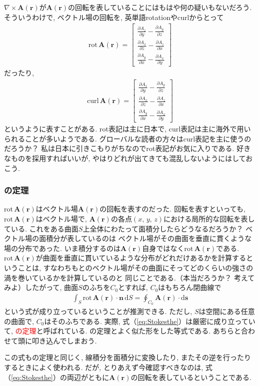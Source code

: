 $\nabla \times \bm{A}(\bm{r})$が$\bm{A}(\bm{r})$の回転を表していることにはもはや何の疑いもないだろう. 
そういうわけで, ベクトル場の回転を, 英単語rotationやcurlからとって
\begin{eqnarray}
\mathrm{rot} \, \bm{A}(\bm{r}) = \left[
\begin{array}{c}
\displaystyle
\frac{\partial A_z}{\partial y} - \frac{\partial A_y}{\partial z} \\
\displaystyle
\frac{\partial A_x}{\partial z} - \frac{\partial A_z}{\partial x} \\
\displaystyle
\frac{\partial A_y}{\partial x} - \frac{\partial A_x}{\partial y} 
\end{array}
\right]
\label{eq:rotrot}
\end{eqnarray}
だったり, 
\begin{eqnarray}
\mathrm{curl} \, \bm{A}(\bm{r}) = \left[
\begin{array}{c}
\displaystyle
\frac{\partial A_z}{\partial y} - \frac{\partial A_y}{\partial z} \\
\displaystyle
\frac{\partial A_x}{\partial z} - \frac{\partial A_z}{\partial x} \\
\displaystyle
\frac{\partial A_y}{\partial x} - \frac{\partial A_x}{\partial y} 
\end{array}
\right]
\label{eq:rotcurl}
\end{eqnarray}
というように表すことがある. rot表記は主に日本で, curl表記は主に海外で用いられることが多いようである. 
グローバルな読者の方々はcurl表記を主に使うのだろうか？ 私は日本に引きこもりがちなのでrot表記がお気に入りである. 
好きなものを採用すればいいが, やはりどれが出てきても混乱しないようにはしておこう. 

\subsubsection{の定理}
$\mathrm{rot} \, \bm{A}(\bm{r})$はベクトル場$\bm{A}(\bm{r})$の回転を表すのだった. 
回転を表すといっても, $\mathrm{rot} \, \bm{A}(\bm{r})$はベクトル場で, 
$\bm{A}(\bm{r})$の各点$(x, \, y, \, z)$における局所的な回転を表している. 
これをある曲面$S$上全体にわたって面積分したらどうなるだろうか？ ベクトル場の面積分が表しているのは
ベクトル場がその曲面を垂直に貫くような場の分布であった. 
いま積分するのは$\bm{A}(\bm{r})$自身ではなく$\mathrm{rot} \, \bm{A}(\bm{r})$である. 
$\mathrm{rot} \, \bm{A}(\bm{r})$が曲面を垂直に貫いているような分布がどれだけあるかを計算するということは, 
すなわちもとのベクトル場がその曲面にそってどのくらいの強さの渦を巻いているかを計算しているのと
同じことである.（本当だろうか？ 考えてみよ）したがって, 曲面$S$のふちを$C_0$とすれば, $C_0$はもちろん閉曲線で
\begin{eqnarray}
\int_S \mathrm{rot} \, \bm{A}(\bm{r}) \cdot \bm{n} \, \mathrm{d} S =
\oint_{C_0} \bm{A}(\bm{r}) \cdot \mathrm{d}\bm{s}
\label{eq:Stokesthe}
\end{eqnarray}
という式が成り立っているということが推測できる. ただし, $S$は空間にある任意の曲面で, 
$C_0$はそのふちである. 
実際, 式（\ref{eq:Stokesthe}）は厳密に成り立っていて, \textcolor{red}{の定理}と呼ばれている. 
の定理とよく似た形をした等式である. あちらと合わせて頭に叩き込んでしまおう. 

この式もの定理と同じく, 線積分を面積分に変換したり, またその逆を行ったりするときによく使われる. 
だが, とりあえず今確認すべきなのは, 
式（\ref{eq:Stokesthe}）の両辺がともに$\bm{A}(\bm{r})$の回転を表しているということである. 


